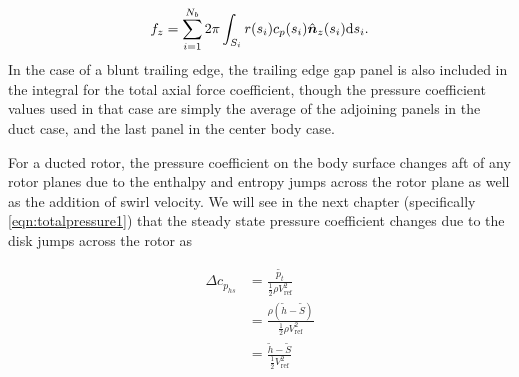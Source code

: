 \begin{equation}
    \label{eqn:fzbody}
    f_z = \sum_{i=1}^{N_b} 2 \pi \int_{S_i} r(s_i) c_p(s_i) \hat{\bm{n}}_{z}(s_i) \mathrm{d} s_i.
\end{equation}
%
In the case of a blunt trailing edge, the trailing edge gap panel is also included in the integral for the total axial force coefficient, though the pressure coefficient values used in that case are simply the average of the adjoining panels in the duct case, and the last panel in the center body case.
%


For a ducted rotor, the pressure coefficient on the body surface changes aft of any rotor planes due to the enthalpy and entropy jumps across the rotor plane as well as the addition of swirl velocity.
%
We will see in the next chapter (specifically \cref{eqn:totalpressure1}) that the steady state pressure coefficient changes due to the disk jumps across the rotor as

\begin{equation}
    \begin{aligned}
        \Delta c_{p_{hs}} &= \frac{\widetilde{p_t}}{\frac{1}{2} \rho V_\text{ref}^2} \\
                          &= \frac{\rho \left(\widetilde{h}-\widetilde{S} \right)}{\frac{1}{2} \rho V_\text{ref}^2} \\
                          &= \frac{\widetilde{h}-\widetilde{S}}{\frac{1}{2} V_\text{ref}^2}
    \end{aligned}
\end{equation}

